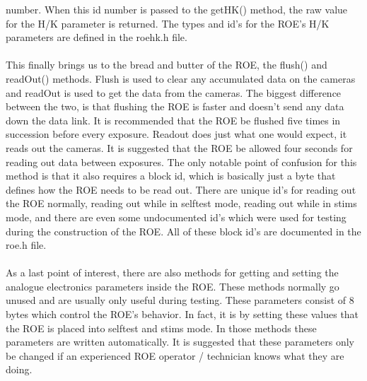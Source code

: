 number. When this id number is passed to the getHK() method, the raw value for the H/K parameter is returned.
The types and id's for the ROE's H/K parameters are defined in the roehk.h file.\\
\\
This finally brings us to the bread and butter of the ROE, the flush() and readOut() methods. Flush is used to
clear any accumulated data on the cameras and readOut is used to get the data from the cameras. The biggest difference
between the two, is that flushing the ROE is faster and doesn't send any data down the data link. It is recommended that
the ROE be flushed five times in succession before every exposure. Readout does just what one would expect, it
reads out the cameras. It is suggested that the ROE be allowed four seconds for reading out data between exposures.
The only notable point of confusion for this method is that it also requires a block id, which is basically just
a byte that defines how the ROE needs to be read out. There are unique id's for reading out the ROE normally, reading out
while in selftest mode, reading out while in stims mode, and there are even some undocumented id's which were used for
testing during the construction of the ROE. All of these block id's are documented in the roe.h file.\\
\\
As a last point of interest, there are also methods for getting and setting the analogue electronics parameters inside
the ROE. These methods normally go unused and are usually only useful during testing. These parameters consist of 8
bytes which control the ROE's behavior. In fact, it is by setting these values that the ROE is placed into selftest
and stims mode. In those methods these parameters are written automatically. It is suggested that these parameters only
be changed if an experienced ROE operator / technician knows what they are doing.

